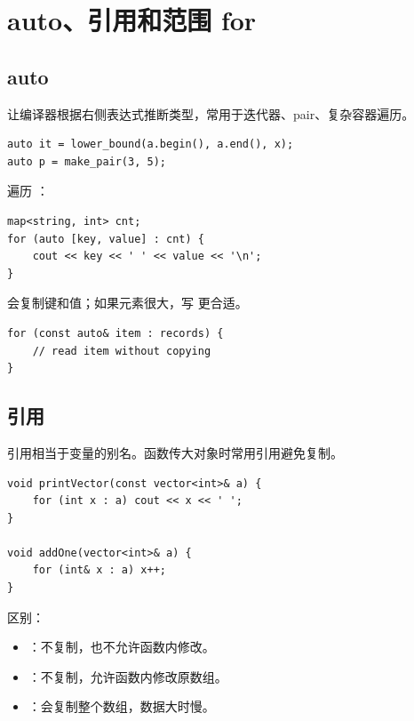 \section{auto、引用和范围 for}\label{sec:04-8}

\subsection{auto}

 让编译器根据右侧表达式推断类型，常用于迭代器、pair、复杂容器遍历。

\begin{lstlisting}
auto it = lower_bound(a.begin(), a.end(), x);
auto p = make_pair(3, 5);
\end{lstlisting}

遍历 ：

\begin{lstlisting}
map<string, int> cnt;
for (auto [key, value] : cnt) {
    cout << key << ' ' << value << '\n';
}
\end{lstlisting}

 会复制键和值；如果元素很大，写  更合适。

\begin{lstlisting}
for (const auto& item : records) {
    // read item without copying
}
\end{lstlisting}

\subsection{引用}

引用相当于变量的别名。函数传大对象时常用引用避免复制。

\begin{lstlisting}
void printVector(const vector<int>& a) {
    for (int x : a) cout << x << ' ';
}

void addOne(vector<int>& a) {
    for (int& x : a) x++;
}
\end{lstlisting}

区别：

\begin{itemize}
  \item {}：不复制，也不允许函数内修改。
  \item {}：不复制，允许函数内修改原数组。
  \item {}：会复制整个数组，数据大时慢。
\end{itemize}

